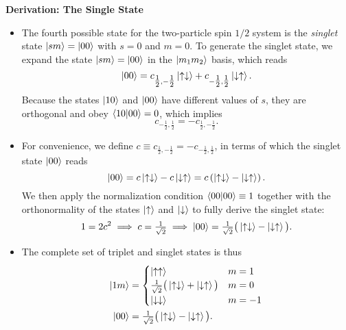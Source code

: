 \documentclass[11pt, a4paper]{article}
\newcommand{\ua}{\uparrow}  %
\newcommand{\da}{\downarrow}  %
\begin{document}
\textbf{Derivation: The Single State}
\begin{itemize}
    \item The fourth possible state for the two-particle spin $ 1/2 $ system is the \textit{singlet} state $ \ket{sm} = \ket{00} $ with $ s = 0 $ and $ m = 0 $. To generate the singlet state, we expand the state $ \ket{sm} = \ket{00} $ in the $ \ket{m_{1}m_{2}} $ basis, which reads
    \begin{equation*}
        \ket{00} = c_{\tfrac{1}{2},-\tfrac{1}{2}} \ket{\ua\da} + c_{-\tfrac{1}{2}, \tfrac{1}{2}}\ket{\da \ua}.
    \end{equation*}
    Because the states $ \ket{10} $ and $ \ket{00} $ have different values of $ s $, they are orthogonal and obey $ \braket{10}{00} = 0 $, which implies
    \begin{equation*}
        c_{-\tfrac{1}{2}, \tfrac{1}{2}} = - c_{\tfrac{1}{2}, -\tfrac{1}{2}}.
    \end{equation*}

    \item For convenience, we define $ c \equiv c_{\tfrac{1}{2}, -\tfrac{1}{2}} = - c_{-\tfrac{1}{2}, \tfrac{1}{2}} $, in terms of which the singlet state $ \ket{00} $ reads
    \begin{equation*}
        \ket{00} = c \ket{\ua \da} - c \ket{\da \ua} = c \left( \ket{\ua \da} - \ket{\da \ua}\right).
    \end{equation*}
    We then apply the normalization condition $ \braket{00}{00} \equiv 1 $ together with the orthonormality of the states $ \ket{\ua} $ and $ \ket{\da} $ to fully derive the singlet state:
    \begin{equation*}
        1 = 2c^{2} \implies c = \tfrac{1}{\sqrt{2}} \implies \ket{00} = \tfrac{1}{\sqrt{2}} \big( \ket{\ua\da} - \ket{\da \ua} \big).
    \end{equation*}
    
    \item The complete set of triplet and singlet states is thus
    \begin{align*}
        \ket{1m} &= 
        \begin{cases}
            \ket{\ua\ua} & m = 1\\
            \tfrac{1}{\sqrt{2}} \big( \ket{\ua\da} + \ket{\da\ua} \big) & m = 0\\
            \ket{\da\da} & m = -1
        \end{cases}\\
        \ket{00} &= \tfrac{1}{\sqrt{2}} \big( \ket{\ua\da} - \ket{\da \ua} \big).
    \end{align*}
   
\end{itemize}
\end{document}
